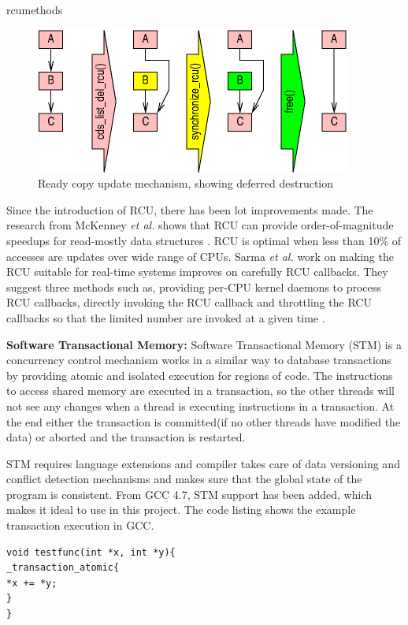 \begin{labeling}{rcumethods}
\begin{figure}[h]
\centering
\includegraphics[width=0.7\linewidth]{figures/rcu}
\caption{Ready copy update mechanism, showing deferred destruction \cite{whatisrcu}}
\label{fig:rcu}
\end{figure}
\end{labeling}

Since the introduction of RCU, there has been lot improvements made. The research from McKenney \emph{et al.} shows that RCU can provide order-of-magnitude speedups for read-mostly data structures \cite{whatisrcu}. RCU is optimal when less than 10\% of accesses are updates over wide range of CPUs. Sarma \emph{et al.} work on making the RCU suitable for real-time systems improves on carefully RCU callbacks. They suggest three methods such as,  providing per-CPU kernel daemons to process RCU callbacks, directly invoking the RCU callback and throttling the RCU callbacks so that the limited number are invoked at a given time \cite{sarma2004making}.

\textbf{Software Transactional Memory:}
Software Transactional Memory (STM) is a concurrency control mechanism works in a similar way to database transactions by providing atomic and isolated execution for regions of code. The instructions to access shared memory are executed in a transaction, so the other threads will not see any changes when a thread is executing instructions in a transaction. At the end either the transaction is committed(if no other threads have modified the data) or aborted and the transaction is restarted. 

STM requires language extensions and compiler takes care of data versioning and conflict detection mechanisms and makes sure that the global state of the program is consistent. From GCC 4.7, STM support has been added, which makes it ideal to use in this project. The code listing shows the example transaction execution in GCC.


\begin{lstlisting}[caption={STM example code in GCC},label=sysdeploycode, style=customcpp]
void testfunc(int *x, int *y){
_transaction_atomic{
*x += *y;
}
}
\end{lstlisting}


